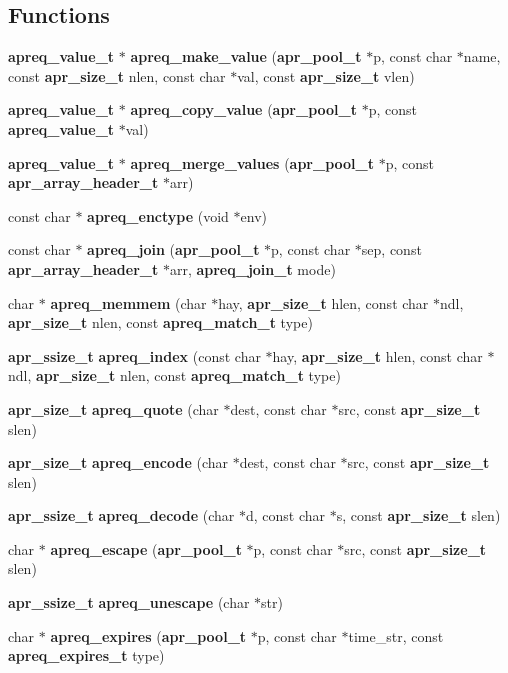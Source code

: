 \subsection*{Functions}
\begin{CompactItemize}
\item 
{\bf apreq\_\-value\_\-t} $\ast$ {\bf apreq\_\-make\_\-value} ({\bf apr\_\-pool\_\-t} $\ast$p, const char $\ast$name, const {\bf apr\_\-size\_\-t} nlen, const char $\ast$val, const {\bf apr\_\-size\_\-t} vlen)
\item 
{\bf apreq\_\-value\_\-t} $\ast$ {\bf apreq\_\-copy\_\-value} ({\bf apr\_\-pool\_\-t} $\ast$p, const {\bf apreq\_\-value\_\-t} $\ast$val)
\item 
{\bf apreq\_\-value\_\-t} $\ast$ {\bf apreq\_\-merge\_\-values} ({\bf apr\_\-pool\_\-t} $\ast$p, const {\bf apr\_\-array\_\-header\_\-t} $\ast$arr)
\item 
const char $\ast$ {\bf apreq\_\-enctype} (void $\ast$env)
\item 
const char $\ast$ {\bf apreq\_\-join} ({\bf apr\_\-pool\_\-t} $\ast$p, const char $\ast$sep, const {\bf apr\_\-array\_\-header\_\-t} $\ast$arr, {\bf apreq\_\-join\_\-t} mode)
\item 
char $\ast$ {\bf apreq\_\-memmem} (char $\ast$hay, {\bf apr\_\-size\_\-t} hlen, const char $\ast$ndl, {\bf apr\_\-size\_\-t} nlen, const {\bf apreq\_\-match\_\-t} type)
\item 
{\bf apr\_\-ssize\_\-t} {\bf apreq\_\-index} (const char $\ast$hay, {\bf apr\_\-size\_\-t} hlen, const char $\ast$ndl, {\bf apr\_\-size\_\-t} nlen, const {\bf apreq\_\-match\_\-t} type)
\item 
{\bf apr\_\-size\_\-t} {\bf apreq\_\-quote} (char $\ast$dest, const char $\ast$src, const {\bf apr\_\-size\_\-t} slen)
\item 
{\bf apr\_\-size\_\-t} {\bf apreq\_\-encode} (char $\ast$dest, const char $\ast$src, const {\bf apr\_\-size\_\-t} slen)
\item 
{\bf apr\_\-ssize\_\-t} {\bf apreq\_\-decode} (char $\ast$d, const char $\ast$s, const {\bf apr\_\-size\_\-t} slen)
\item 
char $\ast$ {\bf apreq\_\-escape} ({\bf apr\_\-pool\_\-t} $\ast$p, const char $\ast$src, const {\bf apr\_\-size\_\-t} slen)
\item 
{\bf apr\_\-ssize\_\-t} {\bf apreq\_\-unescape} (char $\ast$str)
\item 
char $\ast$ {\bf apreq\_\-expires} ({\bf apr\_\-pool\_\-t} $\ast$p, const char $\ast$time\_\-str, const {\bf apreq\_\-expires\_\-t} type)

\end{CompactItemize}
